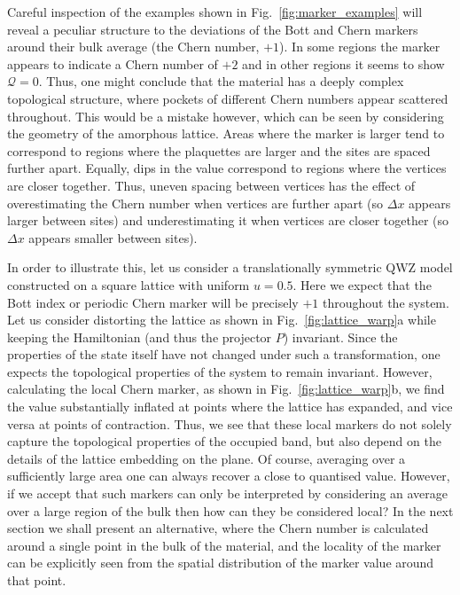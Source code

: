 Careful inspection of the examples shown in Fig.~\ref{fig:marker_examples} will reveal a peculiar structure to the deviations of the Bott and Chern markers around their bulk average (the Chern number, $+1$). In some regions the marker appears to indicate a Chern number of $+2$ and in other regions it seems to show $\mathcal Q = 0$. Thus, one might conclude that the material has a deeply complex topological structure, where pockets of different Chern numbers appear scattered throughout. This would be a mistake however, which can be seen by considering the geometry of the amorphous lattice. Areas where the marker is larger tend to correspond to regions where the plaquettes are larger and the sites are spaced further apart. Equally, dips in the value correspond to regions where the vertices are closer together. Thus, uneven spacing between vertices has the effect of overestimating the Chern number when vertices are further apart (so $\Delta x$ appears larger between sites) and underestimating it when vertices are closer together (so $\Delta x$ appears smaller between sites).

In order to illustrate this, let us consider a translationally symmetric QWZ model constructed on a square lattice with uniform $u = 0.5$. Here we expect that the Bott index or periodic Chern marker will be precisely $+1$ throughout the system. Let us consider distorting the lattice as shown in Fig.~\ref{fig:lattice_warp}a while keeping the Hamiltonian (and thus the projector $P$) invariant. Since the properties of the state itself have not changed under such a transformation, one expects the topological properties of the system to remain invariant. However, calculating the local Chern marker, as shown in Fig.~\ref{fig:lattice_warp}b, we find the value substantially inflated at points where the lattice has expanded, and vice versa at points of contraction. Thus, we see that these local markers do not solely capture the topological properties of the occupied band, but also depend on the details of the lattice embedding on the plane. Of course, averaging over a sufficiently large area one can always recover a close to quantised value. However, if we accept that such markers can only be interpreted by considering an average over a large region of the bulk then how can they be considered local? In the next section we shall present an alternative, where the Chern number is calculated around a single point in the bulk of the material, and the locality of the marker can be explicitly seen from the spatial distribution of the marker value around that point. 
